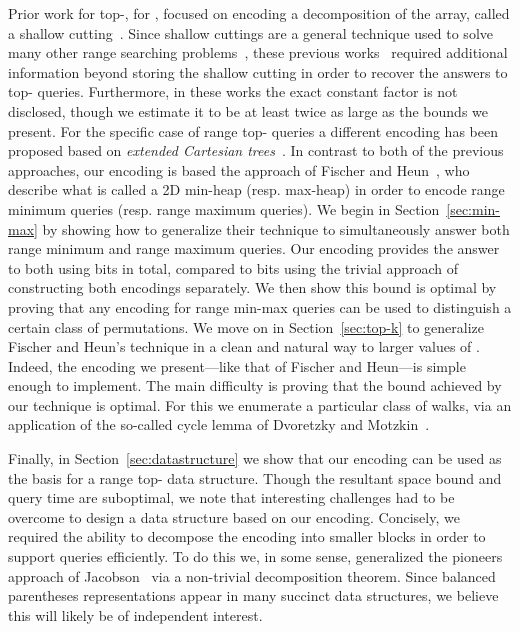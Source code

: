 \documentclass[runningheads]{llncs}
\begin{document}
Prior work for top-, for , focused on encoding a
decomposition of the array, called a shallow
cutting~\cite{GINRS13,NRS14}.  Since shallow cuttings are a general
technique used to solve many other range searching
problems~\cite{M92,JL11}, these previous works~\cite{GINRS13,NRS14}
required additional information beyond storing the shallow cutting in
order to recover the answers to top- queries.  Furthermore, in
these works the exact constant factor is not disclosed, though we
estimate it to be at least twice as large as the bounds we
present. For the specific case of range top- queries a different
encoding has been proposed based on \emph{extended Cartesian
  trees}~\cite{PNRR14}.  In contrast to both of the previous
approaches, our encoding is based the approach of Fischer and
Heun~\cite{FH11}, who describe what is called a 2D min-heap
(resp. max-heap) in order to encode range minimum queries (resp. range
maximum queries).  We begin in Section~\ref{sec:min-max} by showing
how to generalize their technique to simultaneously answer both range
minimum and range maximum queries.  Our encoding provides the answer
to both using  bits in total, compared to  bits
using the trivial approach of constructing both encodings separately.
We then show this bound is optimal by proving that any encoding for
range min-max queries can be used to distinguish a certain class of
permutations.  We move on in Section~\ref{sec:top-k} to generalize
Fischer and Heun's technique in a clean and natural way to larger
values of .  Indeed, the encoding we present---like that of Fischer
and Heun---is simple enough to implement.  The main difficulty is
proving that the bound achieved by our technique is optimal.  For this
we enumerate a particular class of walks, via an application of the
so-called cycle lemma of Dvoretzky and Motzkin~\cite{DM47}.

Finally, in Section~\ref{sec:datastructure} we show that our encoding
can be used as the basis for a range top- data structure.  Though
the resultant space bound and query time are suboptimal, we note that
interesting challenges had to be overcome to design a data structure
based on our encoding.  Concisely, we required the ability to
decompose the encoding into smaller blocks in order to support queries
efficiently.  To do this we, in some sense, generalized the pioneers
approach of Jacobson~\cite{J89} via a non-trivial decomposition
theorem.  Since balanced parentheses representations appear in many
succinct data structures, we believe this will likely be of
independent interest.
\end{document}
